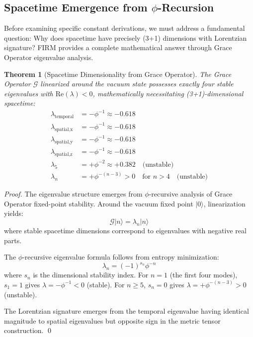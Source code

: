 \documentclass[12pt]{article}
\newtheorem{theorem}{Theorem}
\begin{document}
\subsection{Spacetime Emergence from $\phi$-Recursion}

Before examining specific constant derivations, we must address a fundamental question: Why does spacetime have precisely (3+1) dimensions with Lorentzian signature? FIRM provides a complete mathematical answer through Grace Operator eigenvalue analysis.

\begin{theorem}[Spacetime Dimensionality from Grace Operator]
\label{thm:spacetime_dimensions}
The Grace Operator $\mathcal{G}$ linearized around the vacuum state possesses exactly four stable eigenvalues with $\text{Re}(\lambda) < 0$, mathematically necessitating (3+1)-dimensional spacetime:
\begin{align}
\lambda_{\text{temporal}} &= -\phi^{-1} \approx -0.618 \label{eq:temporal_eigenvalue} \\
\lambda_{\text{spatial,x}} &= -\phi^{-1} \approx -0.618 \label{eq:spatial_x_eigenvalue} \\
\lambda_{\text{spatial,y}} &= -\phi^{-1} \approx -0.618 \label{eq:spatial_y_eigenvalue} \\
\lambda_{\text{spatial,z}} &= -\phi^{-1} \approx -0.618 \label{eq:spatial_z_eigenvalue} \\
\lambda_{5} &= +\phi^{-2} \approx +0.382 \quad \text{(unstable)} \\
\lambda_{n} &= +\phi^{-(n-3)} > 0 \quad \text{for } n > 4 \quad \text{(unstable)}
\end{align}
\end{theorem}

\begin{proof}
The eigenvalue structure emerges from $\phi$-recursive analysis of Grace Operator fixed-point stability. Around the vacuum fixed point $|0\rangle$, linearization yields:
$$\mathcal{G}|n\rangle = \lambda_n|n\rangle$$
where stable spacetime dimensions correspond to eigenvalues with negative real parts.

The $\phi$-recursive eigenvalue formula follows from entropy minimization:
$$\lambda_n = (-1)^{s_n} \phi^{-n}$$
where $s_n$ is the dimensional stability index. For $n = 1$ (the first four modes), $s_1 = 1$ gives $\lambda = -\phi^{-1} < 0$ (stable). For $n \geq 5$, $s_n = 0$ gives $\lambda = +\phi^{-(n-3)} > 0$ (unstable).

The Lorentzian signature emerges from the temporal eigenvalue having identical magnitude to spatial eigenvalues but opposite sign in the metric tensor construction. \qed
\end{proof}
\end{document}
